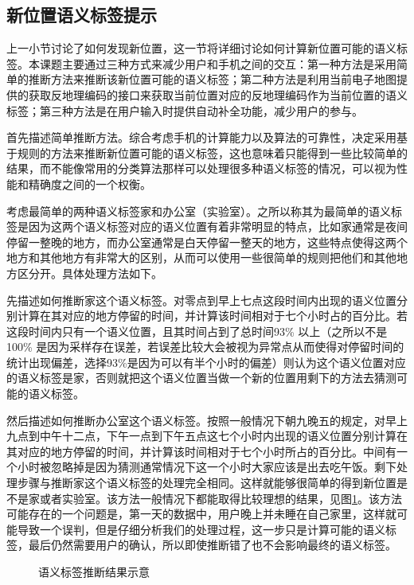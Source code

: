 \subsection{新位置语义标签提示}
上一小节讨论了如何发现新位置，这一节将详细讨论如何计算新位置可能的语义标签。本课题主要通过三种方式来减少用户和手机之间的交互：第一种方法是采用简单的推断方法来推断该新位置可能的语义标签；第二种方法是利用当前电子地图提供的获取反地理编码的接口来获取当前位置对应的反地理编码作为当前位置的语义标签；第三种方法是在用户输入时提供自动补全功能，减少用户的参与。
\par 首先描述简单推断方法。综合考虑手机的计算能力以及算法的可靠性，决定采用基于规则的方法来推断新位置可能的语义标签，这也意味着只能得到一些比较简单的结果，而不能像常用的分类算法那样可以处理很多种语义标签的情况，可以视为性能和精确度之间的一个权衡。
\par 考虑最简单的两种语义标签家和办公室（实验室）。之所以称其为最简单的语义标签是因为这两个语义标签对应的语义位置有着非常明显的特点，比如家通常是夜间停留一整晚的地方，而办公室通常是白天停留一整天的地方，这些特点使得这两个地方和其他地方有非常大的区别，从而可以使用一些很简单的规则把他们和其他地方区分开。具体处理方法如下。
\par 先描述如何推断家这个语义标签。对零点到早上七点这段时间内出现的语义位置分别计算在其对应的地方停留的时间，并计算该时间相对于七个小时占的百分比。若这段时间内只有一个语义位置，且其时间占到了总时间93\% 以上（之所以不是100\% 是因为采样存在误差，若误差比较大会被视为异常点从而使得对停留时间的统计出现偏差，选择93\%是因为可以有半个小时的偏差）则认为这个语义位置对应的语义标签是家，否则就把这个语义位置当做一个新的位置用剩下的方法去猜测可能的语义标签。
\par 然后描述如何推断办公室这个语义标签。按照一般情况下朝九晚五的规定，对早上九点到中午十二点，下午一点到下午五点这七个小时内出现的语义位置分别计算在其对应的地方停留的时间，并计算该时间相对于七个小时所占的百分比。中间有一个小时被忽略掉是因为猜测通常情况下这一个小时大家应该是出去吃午饭。剩下处理步骤与推断家这个语义标签的处理完全相同。这样就能够很简单的得到新位置是不是家或者实验室。该方法一般情况下都能取得比较理想的结果，见图\ref{fig:3_14}。该方法可能存在的一个问题是，第一天的数据中，用户晚上并未睡在自己家里，这样就可能导致一个误判，但是仔细分析我们的处理过程，这一步只是计算可能的语义标签，最后仍然需要用户的确认，所以即使推断错了也不会影响最终的语义标签。
\begin{figure}[htb]
  \centering%
  \caption{语义标签推断结果示意}
  \label{fig:3_14}
\end{figure}
